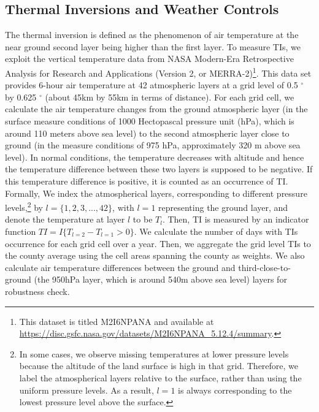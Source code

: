 \documentclass[12pt]{article}
\providecommand{\U}[1]{\protect\rule{.1in}{.1in}}
\begin{document}
  \subsection{Thermal Inversions and Weather Controls}\label{sec:data_TI}
The thermal inversion is defined as the phenomenon of air temperature at the
near ground second layer being higher than the first layer. To measure TIs, we exploit the vertical temperature data from
  NASA Modern-Era Retrospective Analysis for Research and Applications (Version 2, or MERRA-2)\footnote{%
  This dataset is titled M2I6NPANA and available at %
  \url{https://disc.gsfc.nasa.gov/datasets/M2I6NPANA_5.12.4/summary}.}. This
  data set provides 6-hour air temperature at 42 atmospheric layers at a grid level of
  0.5%
  ${{}^\circ}$
  by 0.625%
  ${{}^\circ}$
  (about 45km by 55km in terms of distance). For each grid cell, we calculate the air temperature
changes from the ground atmospheric layer (in the surface measure conditions of
1000 Hectopascal pressure unit (hPa), which is around 110 meters above sea level) to the second atmospheric layer close to ground (in the measure conditions of 975 hPa, approximately 320 m
above sea level). In normal conditions, the temperature decreases with
altitude and hence the temperature difference between these two layers is supposed to be
negative. If this temperature difference is positive, it is counted as an occurrence of TI. 
Formally, We index the atmospherical layers, corresponding to different pressure levels,\footnote{In some cases, we observe missing temperatures at
lower pressure levels because the altitude of the land surface is high in
that grid. Therefore, we label the atmospherical layers relative to the surface, rather than using the uniform pressure levels. As a result, $l = 1$ is always corresponding to the lowest
pressure level above the surface.} by $l = \{1,2,3,...,42\}$, with $l
= 1$ representing the ground layer, and denote the temperature at layer $l$ to be $T_l$. Then, TI is measured by an indicator function $TI =
I\{T_{l=2} - T_{l=1} > 0 \}$. 
We calculate the number of days with TIs occurrence for each grid cell over a year. Then, we aggregate the grid level TIs to the county average using the cell areas spanning the county as weights. We also calculate air temperature
differences between the ground and third-close-to-ground (the 950hPa layer,
which is around 540m above sea level) layers for robustness check.
\end{document}
